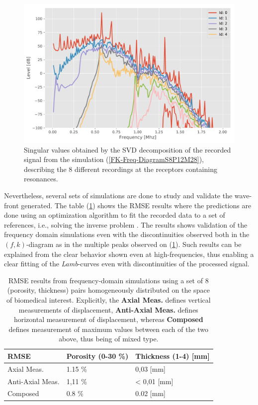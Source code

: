 \begin{figure}[!h]
	\centering
	\includegraphics[scale=.5]{images/FreqRes/2DFreqS812Elastic28_SV.pdf}
	\caption{Singular values obtained by the SVD decomposition of the recorded signal from the simulation (\ref{FK-Freq-DiagramS8P12M28}), describing the 8 different recordings at the receptors containing resonances.}
	\label{SVD-Freq-S8P12M28}
\end{figure}


Nevertheless, several sets of simulations are done to study and validate the wave-front generated. The table (\ref{FreqInvTable}) shows the RMSE results where the predictions are done using an optimization algorithm to fit the recorded data to a set of references, i.e., solving the inverse problem \cite{Minonzio2018}. The results shows validation of the frequency domain simulations even with the discontinuities observed both in the $(f,k)$-diagram as in the multiple peaks observed on (\ref{SVD-Freq-S8P12M28}). Such results can be explained from the clear behavior shown even at high-frequencies, thus enabling a clear fitting of the \textit{Lamb}-curves even with discontinuities of the processed signal.
\begin{table}[!h]
\centering
    \begin{tabular}{l l l}
    \toprule
    \textbf{RMSE} & \textbf{Porosity} (0-30 \%) & \textbf{Thickness} (1-4) [mm]\\
    \midrule
    Axial Meas. & 1.15 \% & 0,03  [mm]\\
    Anti-Axial Meas. & 1,11 \%  & < 0,01 [mm]\\
    Composed & 0.8 \% & 0.02 [mm] \\
    \bottomrule
    \end{tabular}
    \caption{RMSE results from frequency-domain simulations using a set of 8 (porosity, thickness) pairs homogeneously distributed on the space of biomedical interest. Explicitly, the \textbf{Axial Meas.} defines vertical measurements of displacement, \textbf{Anti-Axial Meas.} defines horizontal measurement of displacement, whereas \textbf{Composed} defines measurement of maximum values between each of the two above, thus being of mixed type.}
    \label{FreqInvTable}
\end{table}

